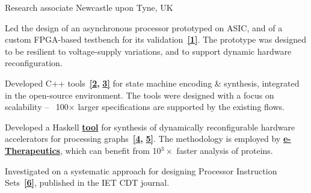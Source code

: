 \begin{cventries}
\cventry
{}
{\vspace{-9mm}Research associate } %
{\vspace{-9mm} \normalcolor Newcastle upon Tyne, UK} %
{}
{	
\begin{cvitems}
\item {Led the design of an asynchronous processor prototyped on 
ASIC, and of a custom FPGA-based testbench for its
validation~{\color{myblue}\href{https://github.com/tuura/papers/tree/master/date-2018}{\textbf{[1]}}}.
 The prototype was designed to be resilient to voltage-supply variations, and 
to support dynamic hardware reconfiguration.}
\item {Developed C++
tools~{\color{myblue}\href{https://github.com/tuura/shutters}{\textbf{[2}}}{\color{myblue}\textbf{,}}
{\color{myblue}\href{https://github.com/tuura/scenco}{\textbf{3]}}}
for state machine encoding \& synthesis, integrated in the open-source
\href{https://workcraft.org/}{} 
environment. The tools were designed with a focus on scalability -- 
~100$\times$ larger specifications are supported by the existing flows.}
\item {Developed a Haskell 
{\color{myblue}\href{https://github.com/tuura/fantasi/tree/master/doc}{\textbf{tool}}}
for synthesis of dynamically reconfigurable hardware accelerators for 
processing 
graphs~{\color{myblue}\href{https://youtu.be/Z2w0hiHY3Us}{\textbf{[4}}}{\color{myblue}\textbf{,}}
{\color{myblue}\href{https://poets-project.org/publications}{\textbf{5]}}}. The 
methodology is employed by 
{\color{myblue}\href{https://www.etherapeutics.co.uk/news-media/videos/}{\textbf{e-Therapeutics}}},
 which can benefit from 10$^{3}\times$ faster analysis of proteins.}
\item {Investigated on a systematic approach for designing Processor 
Instruction 
Sets~{\color{myblue}\href{https://eprint.ncl.ac.uk/file_store/production/251075/92600BF7-92A0-4B22-897A-01892DDA9E2F.pdf}{\textbf{[6]}}},
 published in the IET CDT journal.}
\end{cvitems}
}
\vspace{-5mm}


\end{cventries}
